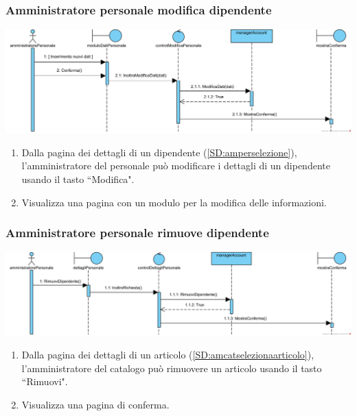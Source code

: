 \documentclass[12pt,a4paper]{article}
\begin{document}
\subsubsection{Amministratore personale modifica dipendente}
\label{SD:ampermodifica}
\begin{center}
\includegraphics[width=\textwidth]{SequenceDiagram/AmministratorePersonaleDipendenteModifica}
\end{center}

\begin{enumerate}
\item Dalla pagina dei dettagli di un dipendente (\ref{SD:amperselezione}), l'amministratore del personale può modificare i dettagli di un dipendente usando il tasto ``Modifica".
\item Visualizza una pagina con un modulo per la modifica delle informazioni.
\end{enumerate}

\subsubsection{Amministratore personale rimuove dipendente}
\label{SD:amperrimuove}
\begin{center}
\includegraphics[width=\textwidth]{SequenceDiagram/AmministratorePersonaleDipendenteRimuove}
\end{center}


\begin{enumerate}
\item Dalla pagina dei dettagli di un articolo (\ref{SD:amcatselezionaarticolo}), l'amministratore del catalogo può rimuovere un articolo usando il tasto ``Rimuovi".
\item Visualizza una pagina di conferma.
\end{enumerate}
\end{document}
